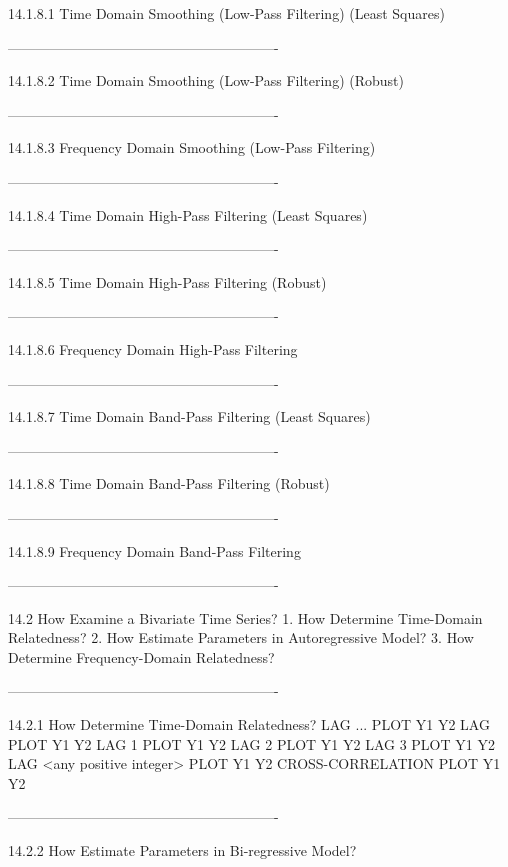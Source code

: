 14.1.8.1
Time Domain Smoothing (Low-Pass Filtering) (Least Squares)
 
----------------------------------------------------------
 
14.1.8.2
Time Domain Smoothing (Low-Pass Filtering) (Robust)
 
----------------------------------------------------------
 
14.1.8.3
Frequency Domain Smoothing (Low-Pass Filtering)
 
----------------------------------------------------------
 
14.1.8.4
Time Domain High-Pass Filtering (Least Squares)
 
----------------------------------------------------------
 
14.1.8.5
Time Domain High-Pass Filtering (Robust)
 
----------------------------------------------------------
 
14.1.8.6
Frequency Domain High-Pass Filtering
 
----------------------------------------------------------
 
14.1.8.7
Time Domain Band-Pass Filtering (Least Squares)
 
----------------------------------------------------------
 
14.1.8.8
Time Domain Band-Pass Filtering (Robust)
 
----------------------------------------------------------
 
14.1.8.9
Frequency Domain Band-Pass Filtering
 
----------------------------------------------------------
 
14.2
How Examine a Bivariate Time Series?
   1. How Determine Time-Domain Relatedness?
   2. How Estimate Parameters in Autoregressive Model?
   3. How Determine Frequency-Domain Relatedness?
 
----------------------------------------------------------
 
14.2.1
How Determine Time-Domain Relatedness?
      LAG ... PLOT Y1 Y2
         LAG PLOT Y1 Y2
         LAG 1 PLOT Y1 Y2
         LAG 2 PLOT Y1 Y2
         LAG 3 PLOT Y1 Y2
         LAG <any positive integer> PLOT Y1 Y2
      CROSS-CORRELATION PLOT Y1 Y2
 
----------------------------------------------------------
 
14.2.2
How Estimate Parameters in Bi-regressive Model?
 
